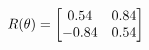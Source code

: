 \documentclass[preview]{standalone}
\begin{document}
\begin{align*}
\special{dvisvgm:raw <g id='unique000'>}R(\theta) = \begin{bmatrix}0.54 & 0.84\\-0.84 & 0.54\end{bmatrix}\special{dvisvgm:raw </g>}
\end{align*}
\end{document}
